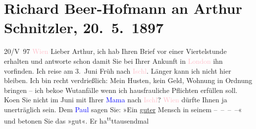 

               \section[Richard Beer-Hofmann an Arthur Schnitzler, 20. 5. 1897]{ Richard Beer-Hofmann an Arthur Schnitzler,
                    20. 5. 1897}\nopagebreak{}\rehead{ }\normalsize\beginnumbering{} \toendnotes[C]{\smallbreak\pagebreak[2]} 
\toendnotes[C]{\smallbreak}\pstart
           \raggedleft{}{\pb}20/V 97{ }\textcolor{pink}{Wien}{}\ledrightnote{\textcolor{pink}{Wien}}\pend
           \pstart
           Lieber Arthur, ich hab Ihren Brief vor einer Viertelstunde
                    erhalten und antworte schon damit Sie bei Ihrer Ankunft in \textcolor{pink}{London}{}\ledrightnote{\textcolor{pink}{London}} ihn vorfinden. Ich reise am
                        3. Juni Früh nach \textcolor{pink}{Ischl}{}\ledrightnote{\textcolor{pink}{Bad Ischl}}.
                    Länger kann ich nicht hier bleiben. Ich bin {\pb}recht verdrießlich: Mein
                    Husten, kein Geld, Wohnung in Ordnung bringen – ich beko{\geminationm}e Wutanfälle wenn ich hausfrauliche Pflichten
                    erfüllen soll. Ko{\geminationm}en Sie nicht {\pb}im Juni mit
                    Ihrer \textcolor{blue}{Mama}{} nach \textcolor{pink}{Ischl}{}\ledrightnote{\textcolor{pink}{Bad Ischl}}? \textcolor{pink}{Wien}{}\ledrightnote{\textcolor{pink}{Wien}}
                    dürfte Ihnen ja unerträglich sein.\pend
           \pstart
           Dem \textcolor{blue}{Paul}{}\ledrightnote{\textcolor{blue}{Paul Goldmann}}
                sagen Sie: »Ein \uline{guter} Mensch in seinem – – – –« und betonen Sie
                    das »gut«. Er ha\substVorne{}\textsuperscript{tt}\substDazwischen{}t\substHinten{}{ }{\pb}tausendmal
